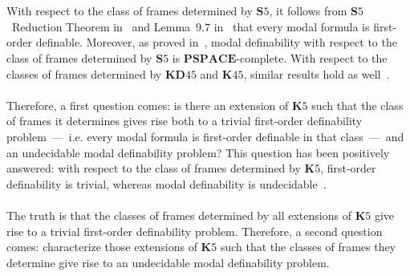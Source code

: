 \documentclass[draft]{article}
\def\PSPACE{\mathbf{PSPACE}}
\def\S{\mathbf{S}}
\def\K{\mathbf{K}}
\def\KD{\mathbf{KD}}
\begin{document}
%
%
\\
\\
%
%
With respect to the class of frames determined by $\S5$, it follows from $\S5$~Reduction Theorem in~\cite[Page~$51$]{Hughes:Cresswell:1968} and Lemma~$9.7$ in~\cite[Page~$99$]{vanBenthem:1983} that every modal formula is first-order definable.
Moreover, as proved in~\cite{Balbiani:Tinchev:2005,Balbiani:Tinchev:2006}, modal definability with respect to the class of frames determined by $\S5$ is $\PSPACE$-complete.
%
%
%
%
With respect to the classes of frames determined by $\KD45$ and $\K45$, similar results hold as well~\cite{Georgiev:2017a,Georgiev:2017b}.
%
%
\\
\\
%
%
Therefore, a first question comes: is there an extension of $\K5$ such that the class of frames it determines gives rise both to a trivial first-order definability problem~---~i.e. every modal formula is first-order definable in that class~---~and an undecidable modal definability problem?
This question has been positively answered: with respect to the class of frames determined by $\K5$, first-order definability is trivial, whereas modal definability is undecidable~\cite{Balbiani:Georgiev:Tinchev:2018}.
%
%
\\
\\
%
%
The truth is that the classes of frames determined by all extensions of $\K5$ give rise to a trivial first-order definability problem.
%
%
%
%
Therefore, a second question comes: characterize those extensions of $\K5$ such that the classes of frames they determine give rise to an undecidable modal definability problem.
\end{document}
